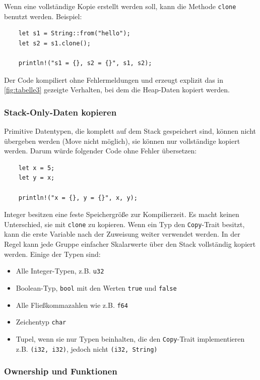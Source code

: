 Wenn eine vollständige Kopie erstellt werden soll, kann die Methode \verb"clone" benutzt werden. Beispiel:

\begin{lstlisting}
    let s1 = String::from("hello");
    let s2 = s1.clone();

    println!("s1 = {}, s2 = {}", s1, s2);
\end{lstlisting}

Der Code kompiliert ohne Fehlermeldungen und erzeugt explizit das in \autoref{fig:tabelle3} gezeigte Verhalten, bei dem die Heap-Daten kopiert werden.

\subsubsection{Stack-Only-Daten kopieren}

Primitive Datentypen, die komplett auf dem Stack gespeichert sind, können nicht übergeben werden (Move nicht möglich), sie können nur vollständige kopiert werden. Darum würde folgender Code ohne Fehler übersetzen:

\begin{lstlisting}
    let x = 5;
    let y = x;

    println!("x = {}, y = {}", x, y);
\end{lstlisting}

Integer besitzen eine feste Speichergröße zur Kompilierzeit. Es macht keinen Unterschied, sie mit \verb"clone" zu kopieren. Wenn ein Typ den \verb"Copy"-Trait besitzt, kann die erste Variable nach der Zuweisung weiter verwendet werden. In der Regel kann jede Gruppe einfacher Skalarwerte über den Stack vollständig kopiert werden. Einige der Typen sind:

\begin{itemize}
    \item Alle Integer-Typen, z.B. \verb"u32"
    \item Boolean-Typ, \verb"bool" mit den Werten \verb"true" und \verb"false"
    \item Alle Fließkommazahlen wie z.B. \verb"f64"
    \item Zeichentyp \verb"char"
    \item Tupel, wenn sie nur Typen beinhalten, die den \verb"Copy"-Trait implementieren z.B. \verb"(i32, i32)", jedoch nicht \verb"(i32, String)"
\end{itemize}

\subsubsection{Ownership und Funktionen}


